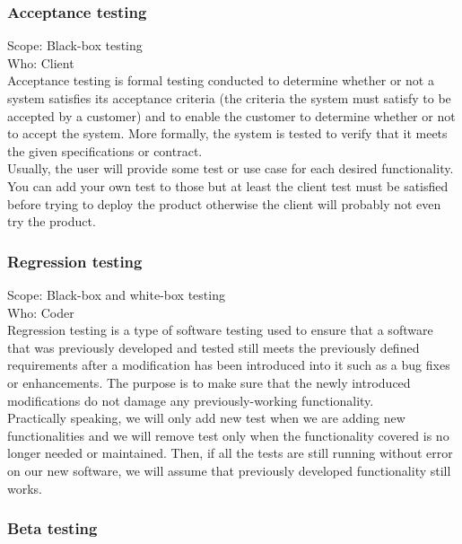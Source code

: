 \documentclass[12pt]{article}
\begin{document}
\subsubsection{Acceptance testing}

Scope: Black-box testing\\
Who: Client\\

Acceptance testing is formal testing conducted to determine whether or not a system satisfies its acceptance criteria (the criteria the system must satisfy to be accepted by a customer) and to enable the customer to determine whether or not to accept the system. More formally, the system is tested to verify that it meets the given specifications or contract.\\

Usually, the user will provide some test or use case for each desired functionality. You can add your own test to those but at least the client test must be satisfied before trying to deploy the product otherwise the client will probably not even try the product.

\subsubsection{Regression testing}

Scope: Black-box and white-box testing\\
Who: Coder\\

Regression testing is a type of software testing used to ensure that a software that was previously developed and tested still meets the previously defined requirements after a modification has been introduced into it such as a bug fixes or enhancements. The purpose is to make sure that the newly introduced modifications do not damage any previously-working functionality.\\

Practically speaking, we will only add new test when we are adding new functionalities and we will remove test only when the functionality covered is no longer needed or maintained. Then, if all the tests are still running without error on our new software, we will assume that previously developed functionality still works.

\subsubsection{Beta testing}
\end{document}
